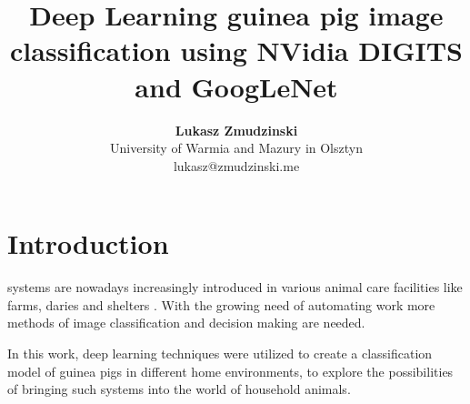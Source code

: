 \documentclass[10pt,journal,compsoc]{IEEEtran}
\begin{document}
    
    \title{Deep Learning guinea pig image classification using NVidia DIGITS and GoogLeNet}
    
    \author{\textbf{Lukasz Zmudzinski} \\ University of Warmia and Mazury in Olsztyn \\ lukasz@zmudzinski.me}
    
    
    
    \maketitle
    \IEEEdisplaynontitleabstractindextext
    \IEEEpeerreviewmaketitle
    \section{Introduction}
    \label{sec:introduction}
    
     systems are nowadays increasingly introduced in various animal care facilities like farms, daries and shelters \cite{agrirobo, dairyrobo}. With the growing need of automating work more methods of image classification and decision making are needed. 

    In this work, deep learning techniques were utilized to create a classification model of guinea pigs in different home environments, to explore the possibilities of bringing such systems into the world of household animals.
    
\end{document}
